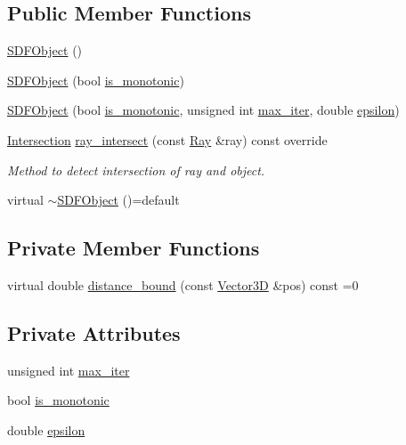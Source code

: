 \subsection*{Public Member Functions}
\begin{DoxyCompactItemize}
\item 
\hyperlink{classSDFObject_a9aeb5037eb692e6502ae2c523ed87b29}{S\+D\+F\+Object} ()
\item 
\hyperlink{classSDFObject_a56fffe33b0be8b81e2a38df61d09ccfd}{S\+D\+F\+Object} (bool \hyperlink{classSDFObject_af366e048b8af77961de4a1c5a45dc110}{is\+\_\+monotonic})
\item 
\hyperlink{classSDFObject_a908bc77db501ad2b4e04dcecc389cfee}{S\+D\+F\+Object} (bool \hyperlink{classSDFObject_af366e048b8af77961de4a1c5a45dc110}{is\+\_\+monotonic}, unsigned int \hyperlink{classSDFObject_aff2946d73110ace629e66f9eac2c13aa}{max\+\_\+iter}, double \hyperlink{classSDFObject_a5bcc7f77148687f9545f0ade0db6c7f0}{epsilon})
\item 
\hyperlink{classIntersection}{Intersection} \hyperlink{classSDFObject_a3870048585282b8176a05ca46ab8695d}{ray\+\_\+intersect} (const \hyperlink{classRay}{Ray} \&ray) const override
\begin{DoxyCompactList}\small\item\em Method to detect intersection of ray and object. \end{DoxyCompactList}\item 
virtual \hyperlink{classSDFObject_a3ceca3fd0d007ecb4b39993d30afa623}{$\sim$\+S\+D\+F\+Object} ()=default
\end{DoxyCompactItemize}
\subsection*{Private Member Functions}
\begin{DoxyCompactItemize}
\item 
virtual double \hyperlink{classSDFObject_ac34f5232b6ea395178d33e3b084d5a93}{distance\+\_\+bound} (const \hyperlink{classVector3D}{Vector3D} \&pos) const =0
\end{DoxyCompactItemize}
\subsection*{Private Attributes}
\begin{DoxyCompactItemize}
\item 
unsigned int \hyperlink{classSDFObject_aff2946d73110ace629e66f9eac2c13aa}{max\+\_\+iter}
\item 
bool \hyperlink{classSDFObject_af366e048b8af77961de4a1c5a45dc110}{is\+\_\+monotonic}
\item 
double \hyperlink{classSDFObject_a5bcc7f77148687f9545f0ade0db6c7f0}{epsilon}
\end{DoxyCompactItemize}
